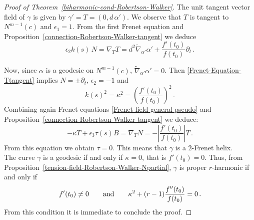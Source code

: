 \documentclass[11pt]{amsart}
\theoremstyle{plain}
\theoremstyle{definition}
\numberwithin{equation}{section}
\begin{document}
\begin{proof}[Proof of Theorem~\ref{biharmonic-cond-Robertson-Walker}]

The unit tangent vector field of $\gamma$ is given by $\gamma' = T = (0, d\,\alpha')$. We observe that $T$ is tangent to $N^{m-1}(c)$ and $\epsilon_1 = 1$. From the first Frenet equation and Proposition~\ref{connection-Robertson-Walker-tangent} we deduce
\begin{equation}\label{Frenet-Equation-Ttangent}
\epsilon_2 k(s) \, N = \nabla_T T = d^2 \widetilde{\nabla}_{\alpha'} \alpha' +  \frac{f'(t_0)}{f(t_0)} \partial_t\,.
\end{equation}

Now, since $\alpha$ is a geodesic on $N^{m-1}(c)$, $\widetilde{\nabla}_{\alpha'} \alpha' = 0$. Then \eqref{Frenet-Equation-Ttangent} implies $N = \pm \partial_t$, $\epsilon_2 = -1$ and 
$$
k(s)^2 = \kappa^2 = \left( \frac{f'(t_0)}{f(t_0)} \right)^2\,.
$$
Combining again Frenet equations \eqref{Frenet-field-general-pseudo} and Proposition~\ref{connection-Robertson-Walker-tangent} we deduce:
\[
-\kappa T + \epsilon_3 \tau(s) B = \nabla_T N = -\left|\frac{f'(t_0)}{f(t_0)}\right| T\,.
\]
From this equation we obtain $\tau = 0$. This means that $\gamma$ is a $2$-Frenet helix.\\
The curve $\gamma$ is a geodesic if and only if $\kappa=0$, that is $f'(t_0)=0$. Thus, from Proposition~\ref{tension-field-Robertson-Walker-Npartial}, $\gamma$ is proper $r$-harmonic if and only if
\[
f'(t_0) \neq 0\qquad {\rm and} \qquad \kappa^2 + (r-1)\dfrac{f''(t_0)}{f(t_0)} = 0\,.
\]
From this condition it is immediate to conclude the proof.
\end{proof}
\end{document}
